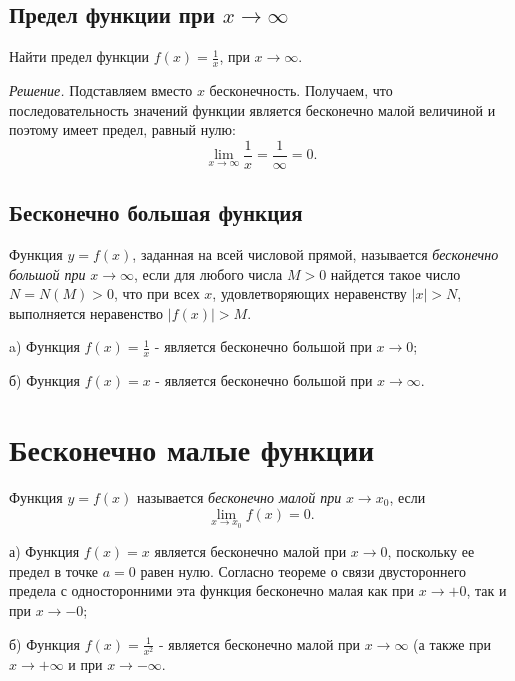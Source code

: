 \documentclass[14pt]{extreport}
\begin{document}
\section{Предел функции при $x\to\infty$}

\begin{example}
Найти предел функции $f(x)=\frac{1}{x}$, при $x\rightarrow \infty$.

\emph{Решение.} Подставляем вместо $x$ бесконечность. Получаем, что последовательность значений функции является бесконечно малой величиной и поэтому имеет предел, равный нулю:
$$\lim\limits_{x\to \infty}\frac{1}{x}=\frac{1}{\infty}=0.$$

\end{example}


\section{Бесконечно большая функция}

Функция $y=f(x)$, заданная на всей числовой прямой, называется \emph{бесконечно большой при} $x\rightarrow \infty$, если для любого числа $M>0$ найдется такое число $N=N(M)>0$, что при всех $x$, удовлетворяющих неравенству $|x|>N$, выполняется неравенство $|f(x)|>M$. 
\begin{example}

a) Функция $f(x)=\frac{1}{x}$ - является бесконечно большой при $x\rightarrow 0$;

б) Функция $f(x)=x$ - является бесконечно большой при $x\rightarrow \infty$.

\end{example}



\chapter{Бесконечно малые функции}

Функция $y=f(x)$ называется \emph{бесконечно малой при} $x\rightarrow x_0$, если $$\lim\limits_{x\to x_0}f(x)=0.$$
\begin{example}
а) Функция $f(x)=x$ является бесконечно малой при $x\rightarrow 0$, поскольку ее предел в точке $a=0$ равен нулю. Согласно теореме о связи двустороннего предела с односторонними эта функция бесконечно малая как при $x\rightarrow+0$, так и при $x\rightarrow -0$;

б) Функция $f(x)=\frac{1}{x^2}$ - является бесконечно малой при $x\rightarrow \infty$ (а также при $x\rightarrow+\infty$ и при $x\rightarrow -\infty$.
\end{example}
\end{document}
